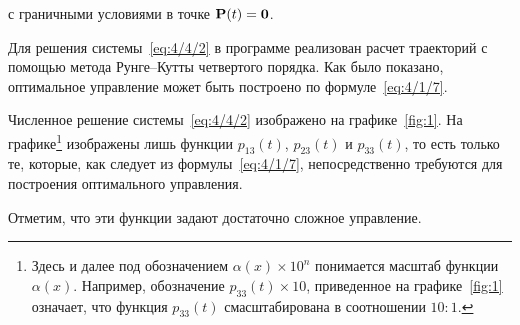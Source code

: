 \eeq

с граничными условиями в точке $\mathbf{P}(t) = \mathbf{0}$.

Для решения системы~\ref{eq:4/4/2} в программе реализован расчет траекторий с помощью метода Рунге--Кутты четвертого порядка. Как было показано, оптимальное управление может быть построено по формуле~\vref{eq:4/1/7}.


Численное решение системы~\ref{eq:4/4/2} изображено на графике~\ref{fig:1}. На графике\footnote{Здесь и далее под обозначением $\alpha(x) \times 10^n$ понимается масштаб функции $\alpha(x)$. Например, обозначение $p_{33}(t) \times 10$, приведенное на графике~\ref{fig:1} означает, что функция $p_{33}(t)$ смасштабирована в соотношении $10:1$.} изображены лишь функции $p_{13}(t)$, $p_{23}(t)$ и $p_{33}(t)$, то есть только те, которые, как следует из формулы~\ref{eq:4/1/7}, непосредственно требуются для построения оптимального управления.

Отметим, что эти функции задают достаточно сложное управление.

